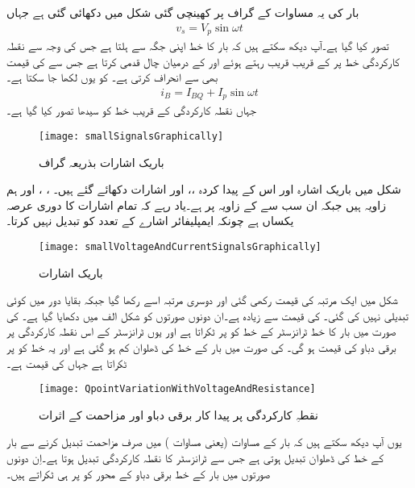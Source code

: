 بار کی یہ مساوات   کے گراف پر کھینچی گئی شکل   میں دکھائی گئی ہے جہاں
\begin{align}
v_s = V_p \sin \omega t
\end{align}
تصور کیا گیا ہے۔آپ دیکھ سکتے ہیں کہ بار کا خط اپنی جگہ سے ہلتا ہے جس کی وجہ سے نقطہ کارکردگی  خط پر   کے قریب قریب رہتے ہوئے  اور  کے درمیان چال قدمی کرتا ہے جس سے  کی قیمت بھی  سے انحراف کرتی ہے۔  کو یوں لکھا جا سکتا ہے۔
\begin{align}
i_B = I_{BQ}+I_p \sin \omega t
\end{align}
جہاں نقطہ کارکردگی کے قریب   خط کو سیدھا تصور کیا گیا ہے۔
\begin{figure}
\centering
\texttt{[image: smallSignalsGraphically]}
\caption{باریک اشارات بذریعہ گراف}
\label{شکل_باریک_اشارات_بذریعہ_گراف}
\end{figure}
شکل   میں باریک اشارہ  اور اس کے پیدا کردہ  ،،  اور  اشارات دکھائے گئے ہیں۔ ،  ،  اور  ہم  زاویہ  ہیں جبکہ  ان سب سے  کے زاویہ پر ہے۔یاد رہے کہ تمام اشارات کا دوری عرصہ  یکساں ہے چونکہ ایمپلیفائر اشارے کے تعدد کو تبدیل نہیں کرتا۔ 
\begin{figure}
\centering
\texttt{[image: smallVoltageAndCurrentSignalsGraphically]}
\caption{باریک اشارات}
\label{شکل_دیگر_باریک_اشارات}
\end{figure}

شکل   میں ایک مرتبہ  کی قیمت  رکھی گئی اور دوسری مرتبہ اسے  رکھا گیا جبکہ بقایا دور میں کوئی تبدیلی نہیں کی گئی۔  کی قیمت  سے زیادہ ہے۔ان دونوں صورتوں کو شکل  الف میں دکھایا گیا ہے۔  کی صورت میں بار کا خط ٹرانزسٹر کے  خط کو  پر ٹکراتا ہے اور یوں ٹرانزسٹر کے اس نقطہ کارکردگی پر برقی دباو  کی قیمت  ہو گی۔  کی صورت میں بار کے خط کی ڈھلوان کم ہو گئی ہے اور یہ  خط کو  پر ٹکراتا ہے جہاں  کی قیمت ہے۔
\begin{figure}
\centering
\texttt{[image: QpointVariationWithVoltageAndResistance]}
\caption{ نقطہِ کارکردگی پر پیدا کار برقی دباو اور مزاحمت کے اثرات}
\label{شکل_نکتہ_کارکردگی_بالمقابل_برقی_دباو_اور_مزاحمت}
\end{figure}
یوں آپ دیکھ سکتے ہیں کہ بار کے مساوات (یعنی مساوات  ) میں صرف مزاحمت تبدیل کرنے سے بار کے خط کی ڈھلوان تبدیل ہوتی ہے جس سے ٹرانزسٹر کا نقطہ کارکردگی تبدیل ہوتا ہے۔اِن دونوں صورتوں میں بار کے خط برقی دباو کے محور کو  پر ہی ٹکراتے ہیں۔

